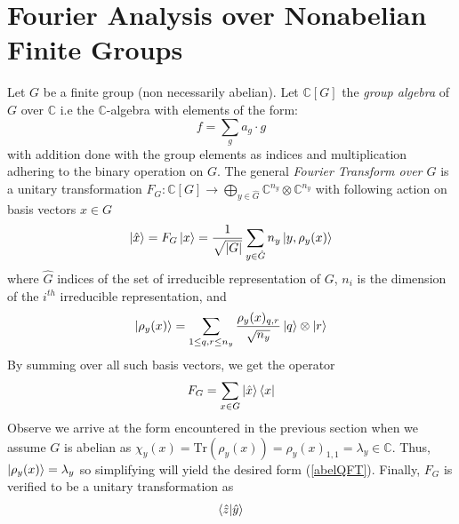 \documentclass{../quantum.tex}
\begin{document}
\section{Fourier Analysis over Nonabelian Finite Groups}

Let $G$ be a finite group (non necessarily abelian).
Let $\mathbb{C}[G]$ the \textit{group algebra} of $G$ over $\mathbb{C}$ i.e the $\mathbb{C}$-algebra with elements of the form:
$$ f = \sum_g a_g \cdot g $$ with addition done with the group elements as indices and multiplication adhering to the binary operation on $G$. The general \textit{Fourier Transform over $G$} is a unitary transformation $F_G: \mathbb{C}[G] \rightarrow \bigoplus_{y \in \hat{G}} \mathbb{C}^{n_y} \otimes \mathbb{C}^{n_y}$ with following action on basis vectors $x \in G$
%
\begin{equation}
  \ket{\hat{x}} = F_G\ket{x} = \frac{1}{\sqrt{|G|}}\sum_{y \in \hat{G}} n_y \ket{y, \rho_y(x)}
\end{equation}
where $\hat{G}$ indices of the set of irreducible representation of $G$, $n_i$ is the dimension of the $i^{th}$ irreducible representation, and
\begin{equation}
  \ket{\rho_y(x)} = \sum_{1 \leq q,r \leq n_y} \frac{\rho_y(x)_{q,r}}{\sqrt{n_y}} \ket{q} \otimes \ket{r}
\end{equation}
%
By summing over all such basis vectors, we get the operator
$$ F_G = \sum_{x \in G} \ket{\hat{x}}\bra{x} $$
%
Observe we arrive at the form encountered in the previous section when we assume $G$ is abelian as $\chi_y(x) = \text{Tr}(\rho_y(x)) = \rho_y(x)_{1,1} = \lambda_y \in \mathbb{C}$. Thus, $\ket{\rho_y(x)} = \lambda_y$ so simplifying will yield the desired form (\ref{abelQFT}).
%
Finally, $F_G$ is verified to be a unitary transformation as
\begin{gather}
  \bra{\hat{z}}\ket{\hat{y}}
\end{gather}
\end{document}
